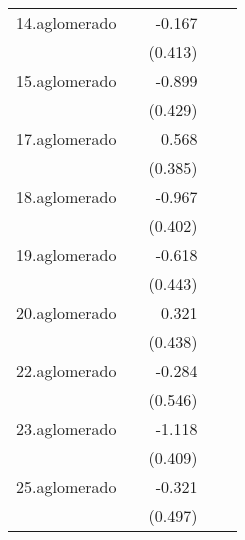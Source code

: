 {\begin{longtable}{l*{4}{D{.}{.}{-1}}}
\addlinespace
14.aglomerado&                     &      -0.167         &                     &                     \\
            &                     &     (0.413)         &                     &                     \\
\addlinespace
15.aglomerado&                     &      -0.899\sym{*}  &                     &                     \\
            &                     &     (0.429)         &                     &                     \\
\addlinespace
17.aglomerado&                     &       0.568         &                     &                     \\
            &                     &     (0.385)         &                     &                     \\
\addlinespace
18.aglomerado&                     &      -0.967\sym{*}  &                     &                     \\
            &                     &     (0.402)         &                     &                     \\
\addlinespace
19.aglomerado&                     &      -0.618         &                     &                     \\
            &                     &     (0.443)         &                     &                     \\
\addlinespace
20.aglomerado&                     &       0.321         &                     &                     \\
            &                     &     (0.438)         &                     &                     \\
\addlinespace
22.aglomerado&                     &      -0.284         &                     &                     \\
            &                     &     (0.546)         &                     &                     \\
\addlinespace
23.aglomerado&                     &      -1.118\sym{**} &                     &                     \\
            &                     &     (0.409)         &                     &                     \\
\addlinespace
25.aglomerado&                     &      -0.321         &                     &                     \\
            &                     &     (0.497)         &                     &                     \\

\end{longtable}}
